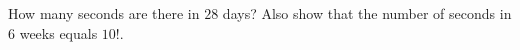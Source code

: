 How many seconds are there in $28$ days? Also show that the number of seconds in $6$ weeks equals $10!$.
